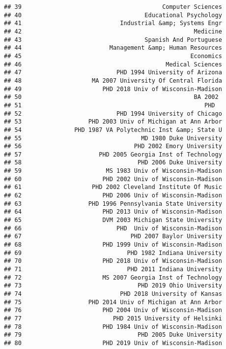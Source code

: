 \documentclass[
]{article}
\begin{document}
\begin{verbatim}
## 39                                        Computer Sciences
## 40                                   Educational Psychology
## 41                            Industrial &amp; Systems Engr
## 42                                                 Medicine
## 43                                   Spanish And Portuguese
## 44                         Management &amp; Human Resources
## 45                                                Economics
## 46                                         Medical Sciences
## 47                           PHD 1994 University of Arizona
## 48                    MA 2007 University Of Central Florida
## 49                       PHD 2018 Univ of Wisconsin-Madison
## 50                                                 BA 2002 
## 51                                                    PHD  
## 52                           PHD 1994 University of Chicago
## 53                   PHD 2003 Univ of Michigan at Ann Arbor
## 54               PHD 1987 VA Polytechnic Inst &amp; State U
## 55                                  MD 1980 Duke University
## 56                                PHD 2002 Emory University
## 57                      PHD 2005 Georgia Inst of Technology
## 58                                 PHD 2006 Duke University
## 59                        MS 1983 Univ of Wisconsin-Madison
## 60                       PHD 2002 Univ of Wisconsin-Madison
## 61                    PHD 2002 Cleveland Institute Of Music
## 62                       PHD 2006 Univ of Wisconsin-Madison
## 63                   PHD 1996 Pennsylvania State University
## 64                       PHD 2013 Univ of Wisconsin-Madison
## 65                       DVM 2003 Michigan State University
## 66                           PHD  Univ of Wisconsin-Madison
## 67                               PHD 2007 Baylor University
## 68                       PHD 1999 Univ of Wisconsin-Madison
## 69                              PHD 1982 Indiana University
## 70                       PHD 2018 Univ of Wisconsin-Madison
## 71                              PHD 2011 Indiana University
## 72                       MS 2007 Georgia Inst of Technology
## 73                                 PHD 2019 Ohio University
## 74                            PHD 2018 University of Kansas
## 75                   PHD 2014 Univ of Michigan at Ann Arbor
## 76                       PHD 2004 Univ of Wisconsin-Madison
## 77                          PHD 2015 University of Helsinki
## 78                       PHD 1984 Univ of Wisconsin-Madison
## 79                                 PHD 2005 Duke University
## 80                       PHD 2019 Univ of Wisconsin-Madison

\end{verbatim}
\end{document}
